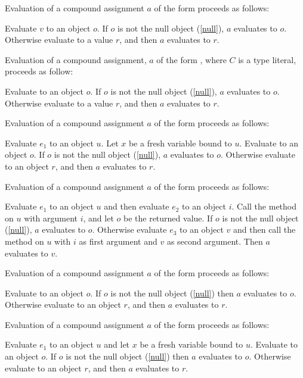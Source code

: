 \documentclass{article}
\begin{document}
\LMHash{}
Evaluation of a compound assignment $a$ of the form 
proceeds as follows:

\LMHash{}
Evaluate $v$ to an object $o$.
If $o$ is not the null object (\ref{null}), $a$ evaluates to $o$.
Otherwise evaluate  to a value $r$,
and then $a$ evaluates to $r$.

\LMHash{}
Evaluation of a compound assignment, $a$ of the form , where $C$ is a type literal, proceeds as follow:

\LMHash{}
Evaluate  to an object $o$.
If $o$ is not the null object (\ref{null}), $a$ evaluates to $o$.
Otherwise evaluate  to a value $r$,
and then $a$ evaluates to $r$.


\LMHash{}
Evaluation of a compound assignment $a$ of the form 
proceeds as follows:

\LMHash{}
Evaluate $e_1$ to an object $u$.
Let $x$ be a fresh variable bound to $u$.
Evaluate  to an object $o$.
If $o$ is not the null object (\ref{null}), $a$ evaluates to $o$.
Otherwise evaluate  to an object $r$,
and then $a$ evaluates to $r$.

\LMHash{}
Evaluation of a compound assignment $a$ of the form 
proceeds as follows:

\LMHash{}
Evaluate $e_1$ to an object $u$ and then evaluate $e_2$ to an object $i$.
Call the \code{[]} method on $u$ with argument $i$, and let $o$ be the returned value.
If $o$ is not the null object (\ref{null}), $a$ evaluates to $o$.
Otherwise evaluate $e_3$ to an object $v$
and then call the \code{[]=} method on $u$ with $i$ as first argument and $v$ as second argument.
Then $a$ evaluates to $v$.

\LMHash{}
Evaluation of a compound assignment $a$ of the form 
proceeds as follows:

\LMHash{}
Evaluate  to an object $o$.
If $o$ is not the null object (\ref{null}) then $a$ evaluates to $o$.
Otherwise evaluate  to an object $r$,
and then $a$ evaluates to $r$.

\LMHash{}
Evaluation of a compound assignment $a$ of the form 
proceeds as follows:

\LMHash{}
Evaluate $e_1$ to an object $u$ and let $x$ be a fresh variable bound to $u$.
Evaluate  to an object $o$.
If $o$ is not the null object (\ref{null}) then $a$ evaluates to $o$.
Otherwise evaluate  to an object $r$,
and then $a$ evaluates to $r$.
\end{document}
